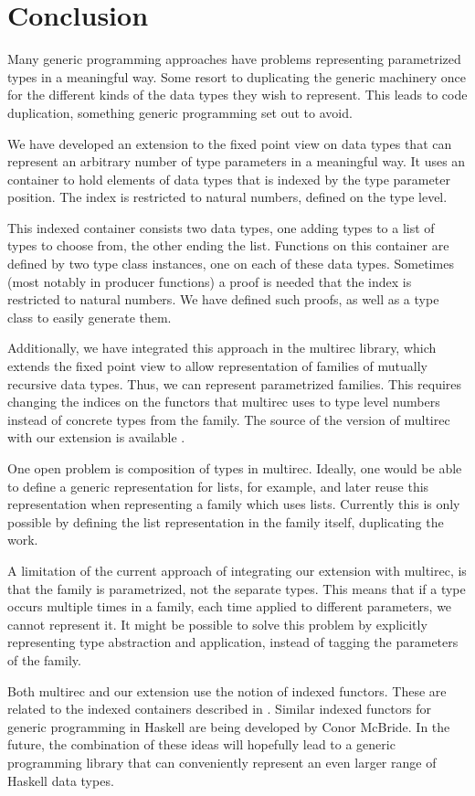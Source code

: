 \chapter{Conclusion}
\label{cha:conclusion}

Many generic programming approaches have problems representing
parametrized types in a meaningful way. Some resort to duplicating the
generic machinery once for the different kinds of the data types they
wish to represent. This leads to code duplication, something generic
programming set out to avoid.

We have developed an extension to the fixed point view on data types
that can represent an arbitrary number of type parameters in a
meaningful way. It uses an container to hold elements of data types
that is indexed by the type parameter position. The index is
restricted to natural numbers, defined on the type level.

This indexed container consists two data types, one adding types to a
list of types to choose from, the other ending the list. Functions on
this container are defined by two type class instances, one on each of
these data types. Sometimes (most notably in producer functions) a
proof is needed that the index is restricted to natural numbers. We
have defined such proofs, as well as a type class to easily generate
them.

Additionally, we have integrated this approach in the multirec
library, which extends the fixed point view to allow representation of
families of mutually recursive data types. Thus, we can represent
parametrized families. This requires changing the indices on the
functors that multirec uses to type level numbers instead of concrete
types from the family. The source of the version of multirec with our
extension is available \cite{mysvn}.

One open problem is composition of types in multirec. Ideally, one
would be able to define a generic representation for lists, for
example, and later reuse this representation when representing a
family which uses lists. Currently this is only possible by defining
the list representation in the family itself, duplicating the work.

A limitation of the current approach of integrating our extension with
multirec, is that the family is parametrized, not the separate types.
This means that if a type occurs multiple times in a family, each time
applied to different parameters, we cannot represent it. It might be
possible to solve this problem by explicitly representing type
abstraction and application, instead of tagging the parameters of
the family.

Both multirec and our extension use the notion of indexed functors.
These are related to the indexed containers described in
\cite{indexedcontainers}.  Similar indexed functors for generic
programming in Haskell are being developed by Conor McBride. In the
future, the combination of these ideas will hopefully lead to a
generic programming library that can conveniently represent an even
larger range of Haskell data types.
